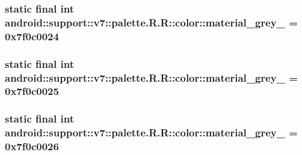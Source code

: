 \hypertarget{classandroid_1_1support_1_1v7_1_1palette_1_1_r_1_1color_b8f5191ef8fb1895d224120ef0d8d485}{
\subsubsection[{material\_\-grey\_\-100}]{\setlength{\rightskip}{0pt plus 5cm}static final int android::support::v7::palette.R.R::color::material\_\-grey\_ = 0x7f0c0024}}
\label{classandroid_1_1support_1_1v7_1_1palette_1_1_r_1_1color_b8f5191ef8fb1895d224120ef0d8d485}


\hypertarget{classandroid_1_1support_1_1v7_1_1palette_1_1_r_1_1color_07ae37a364e58a1a7b0d9c364f7adb84}{
\subsubsection[{material\_\-grey\_\-300}]{\setlength{\rightskip}{0pt plus 5cm}static final int android::support::v7::palette.R.R::color::material\_\-grey\_ = 0x7f0c0025}}
\label{classandroid_1_1support_1_1v7_1_1palette_1_1_r_1_1color_07ae37a364e58a1a7b0d9c364f7adb84}


\hypertarget{classandroid_1_1support_1_1v7_1_1palette_1_1_r_1_1color_aa4a3950cb00de9b0ce8e173ea333f88}{
\subsubsection[{material\_\-grey\_\-50}]{\setlength{\rightskip}{0pt plus 5cm}static final int android::support::v7::palette.R.R::color::material\_\-grey\_ = 0x7f0c0026}}
\label{classandroid_1_1support_1_1v7_1_1palette_1_1_r_1_1color_aa4a3950cb00de9b0ce8e173ea333f88}


